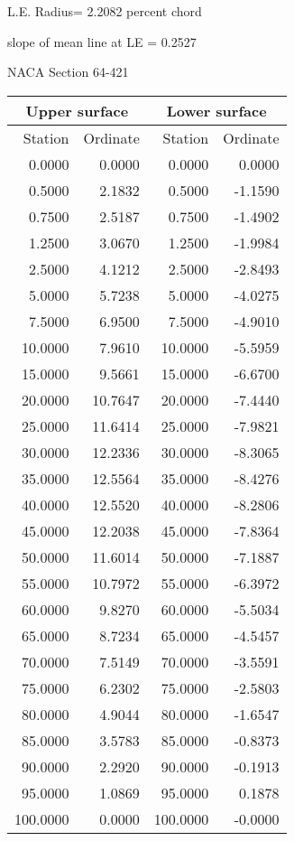\documentclass[11pt]{book}
\begin{document}
L.E. Radius=  2.2082 percent chord


 slope of mean line at LE =  0.2527
 \newpage
  \label{s64-421}
 \begin{Large}
 NACA Section 64-421
 \end{Large}
  
 \vspace{8mm}
 \begin{tabular}{|r|r|r|r|} \hline 
 \multicolumn{2}{|c|}{Upper surface} & \multicolumn{2}{|c|}{Lower surface} \\
 \hline
 Station & Ordinate & Station & Ordinate \\
 \hline
0.0000 & 0.0000 & 0.0000 & 0.0000 \\
0.5000 & 2.1832 & 0.5000 & -1.1590 \\
0.7500 & 2.5187 & 0.7500 & -1.4902 \\
1.2500 & 3.0670 & 1.2500 & -1.9984 \\
2.5000 & 4.1212 & 2.5000 & -2.8493 \\
5.0000 & 5.7238 & 5.0000 & -4.0275 \\
7.5000 & 6.9500 & 7.5000 & -4.9010 \\
10.0000 & 7.9610 & 10.0000 & -5.5959 \\
15.0000 & 9.5661 & 15.0000 & -6.6700 \\
20.0000 & 10.7647 & 20.0000 & -7.4440 \\
25.0000 & 11.6414 & 25.0000 & -7.9821 \\
30.0000 & 12.2336 & 30.0000 & -8.3065 \\
35.0000 & 12.5564 & 35.0000 & -8.4276 \\
40.0000 & 12.5520 & 40.0000 & -8.2806 \\
45.0000 & 12.2038 & 45.0000 & -7.8364 \\
50.0000 & 11.6014 & 50.0000 & -7.1887 \\
55.0000 & 10.7972 & 55.0000 & -6.3972 \\
60.0000 & 9.8270 & 60.0000 & -5.5034 \\
65.0000 & 8.7234 & 65.0000 & -4.5457 \\
70.0000 & 7.5149 & 70.0000 & -3.5591 \\
75.0000 & 6.2302 & 75.0000 & -2.5803 \\
80.0000 & 4.9044 & 80.0000 & -1.6547 \\
85.0000 & 3.5783 & 85.0000 & -0.8373 \\
90.0000 & 2.2920 & 90.0000 & -0.1913 \\
95.0000 & 1.0869 & 95.0000 & 0.1878 \\
100.0000 & 0.0000 & 100.0000 & -0.0000 \\
 \hline 
 \end{tabular}
\end{document}

